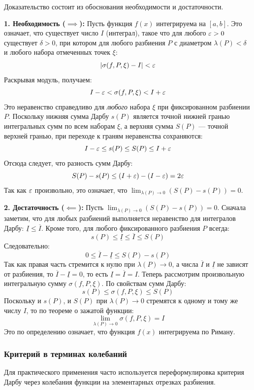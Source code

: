 \begin{tcolorbox}[title=Доказательство, breakable]
Доказательство состоит из обоснования необходимости и достаточности.

\textbf{1. Необходимость ($\implies$):}
Пусть функция $f(x)$ интегрируема на $[a, b]$. Это означает, что существует число $I$ (интеграл), такое что для любого $\varepsilon > 0$ существует $\delta > 0$, при котором для любого разбиения $P$ с диаметром $\lambda(P) < \delta$ и любого набора отмеченных точек $\xi$:
\[ | \sigma(f, P, \xi) - I | < \varepsilon \]
Раскрывая модуль, получаем:
\[ I - \varepsilon < \sigma(f, P, \xi) < I + \varepsilon \]
Это неравенство справедливо для \textit{любого} набора $\xi$ при фиксированном разбиении $P$. Поскольку нижняя сумма Дарбу $s(P)$ является точной нижней гранью интегральных сумм по всем наборам $\xi$, а верхняя сумма $S(P)$ — точной верхней гранью, при переходе к граням неравенства сохраняются:
\[ I - \varepsilon \le s(P) \le S(P) \le I + \varepsilon \]
Отсюда следует, что разность сумм Дарбу:
\[ S(P) - s(P) \le (I + \varepsilon) - (I - \varepsilon) = 2\varepsilon \]
Так как $\varepsilon$ произвольно, это означает, что $\lim_{\lambda(P) \to 0} (S(P) - s(P)) = 0$.

\textbf{2. Достаточность ($\impliedby$):}
Пусть $\lim_{\lambda(P) \to 0} (S(P) - s(P)) = 0$. 
Сначала заметим, что для любых разбиений выполняется неравенство для интегралов Дарбу: $\underline{I} \le \overline{I}$. Кроме того, для любого фиксированного разбиения $P$ всегда:
\[ s(P) \le \underline{I} \le \overline{I} \le S(P) \]
Следовательно:
\[ 0 \le \overline{I} - \underline{I} \le S(P) - s(P) \]
Так как правая часть стремится к нулю при $\lambda(P) \to 0$, а числа $\overline{I}$ и $\underline{I}$ не зависят от разбиения, то $\overline{I} - \underline{I} = 0$, то есть $\underline{I} = \overline{I} = I$.
Теперь рассмотрим произвольную интегральную сумму $\sigma(f, P, \xi)$. По свойствам сумм Дарбу:
\[ s(P) \le \sigma(f, P, \xi) \le S(P) \]
Поскольку и $s(P)$, и $S(P)$ при $\lambda(P) \to 0$ стремятся к одному и тому же числу $I$, то по теореме о зажатой функции:
\[ \lim_{\lambda(P) \to 0} \sigma(f, P, \xi) = I \]
Это по определению означает, что функция $f(x)$ интегрируема по Риману.
\end{tcolorbox}

\subsubsection*{Критерий в терминах колебаний}

Для практического применения часто используется переформулировка критерия Дарбу через колебания функции на элементарных отрезках разбиения.

